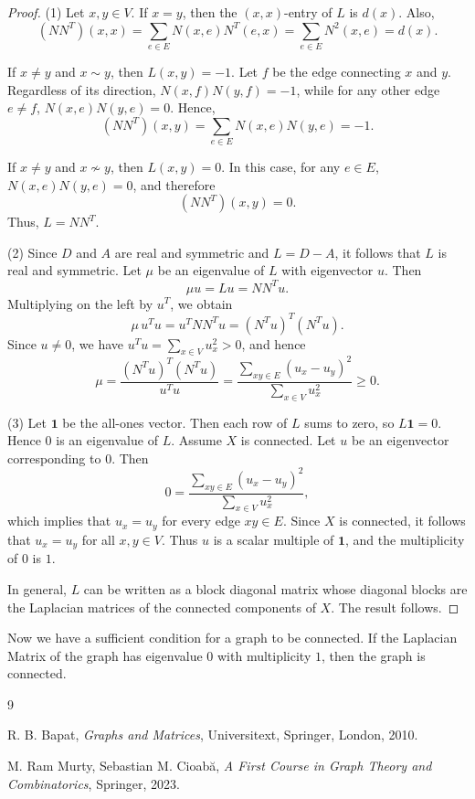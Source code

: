 \documentclass{amsart}
\theoremstyle{plain}
\begin{document}
\begin{proof}
(1) Let $x, y \in V$. If $x = y$, then the $(x,x)$-entry of $L$ is $d(x)$. Also,
\[
(NN^T)(x,x) = \sum_{e \in E} N(x,e)N^T(e,x) 
= \sum_{e \in E} N^2(x,e) = d(x).
\]

If $x \ne y$ and $x \sim y$, then $L(x,y) = -1$. Let $f$ be the edge connecting 
$x$ and $y$. Regardless of its direction, $N(x,f)N(y,f) = -1$, while for any 
other edge $e \ne f$, $N(x,e)N(y,e) = 0$. Hence,
\[
(NN^T)(x,y) = \sum_{e \in E} N(x,e)N(y,e) = -1.
\]

If $x \ne y$ and $x \not\sim y$, then $L(x,y) = 0$. In this case, for any 
$e \in E$, $N(x,e)N(y,e) = 0$, and therefore
\[
(NN^T)(x,y) = 0.
\]
Thus, $L = NN^T$.

\medskip

(2) Since $D$ and $A$ are real and symmetric and $L = D - A$, it follows that 
$L$ is real and symmetric. Let $\mu$ be an eigenvalue of $L$ with eigenvector $u$. 
Then
\[
\mu u = Lu = NN^T u.
\]
Multiplying on the left by $u^T$, we obtain
\[
\mu\, u^T u = u^T NN^T u = (N^T u)^T (N^T u).
\]
Since $u \ne 0$, we have $u^T u = \sum_{x \in V} u_x^2 > 0$, and hence
\[
\mu = \frac{(N^T u)^T (N^T u)}{u^T u}
= \frac{\sum_{xy \in E} (u_x - u_y)^2}{\sum_{x \in V} u_x^2} \ge 0.
\]

\medskip

(3) Let $\mathbf{1}$ be the all-ones vector. Then each row of $L$ sums to zero, so 
$L\mathbf{1} = 0$. Hence $0$ is an eigenvalue of $L$. Assume $X$ is connected. Let $u$ be an eigenvector corresponding to $0$. Then
\[
0 = \frac{\sum_{xy \in E} (u_x - u_y)^2}{\sum_{x \in V} u_x^2},
\]
which implies that $u_x = u_y$ for every edge $xy \in E$. Since $X$ is connected, 
it follows that $u_x = u_y$ for all $x, y \in V$. Thus $u$ is a scalar multiple of 
$\mathbf{1}$, and the multiplicity of $0$ is $1$.

In general, $L$ can be written as a block diagonal matrix whose diagonal blocks are 
the Laplacian matrices of the connected components of $X$. The result follows.
\end{proof}

Now we have a sufficient condition for a graph to be connected. If the Laplacian Matrix of the graph has eigenvalue $0$ with multiplicity $1$, then the graph is connected.





\begin{thebibliography}{9}

R. B. Bapat,
\textit{Graphs and Matrices},
Universitext, Springer, London, 2010.

{M. Ram Murty, Sebastian M. Cioabă}, 
\textit{A First Course in Graph Theory and Combinatorics},
Springer, 2023.

\end{thebibliography}
\end{document}
